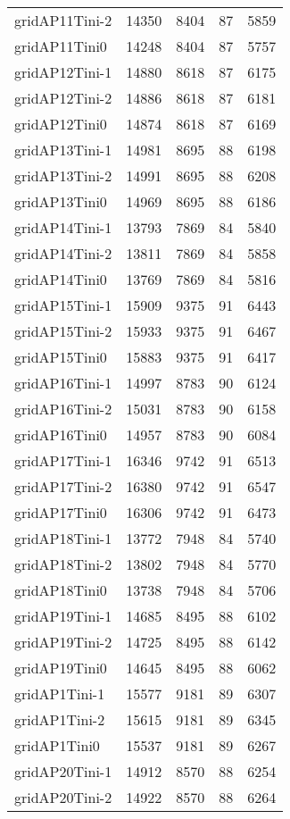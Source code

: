 \begin{longtable}{lrrrr}
gridAP11Tini-2 & 14350 & 8404 & 87 & 5859 \\
gridAP11Tini0 & 14248 & 8404 & 87 & 5757 \\
gridAP12Tini-1 & 14880 & 8618 & 87 & 6175 \\
gridAP12Tini-2 & 14886 & 8618 & 87 & 6181 \\
gridAP12Tini0 & 14874 & 8618 & 87 & 6169 \\
gridAP13Tini-1 & 14981 & 8695 & 88 & 6198 \\
gridAP13Tini-2 & 14991 & 8695 & 88 & 6208 \\
gridAP13Tini0 & 14969 & 8695 & 88 & 6186 \\
gridAP14Tini-1 & 13793 & 7869 & 84 & 5840 \\
gridAP14Tini-2 & 13811 & 7869 & 84 & 5858 \\
gridAP14Tini0 & 13769 & 7869 & 84 & 5816 \\
gridAP15Tini-1 & 15909 & 9375 & 91 & 6443 \\
gridAP15Tini-2 & 15933 & 9375 & 91 & 6467 \\
gridAP15Tini0 & 15883 & 9375 & 91 & 6417 \\
gridAP16Tini-1 & 14997 & 8783 & 90 & 6124 \\
gridAP16Tini-2 & 15031 & 8783 & 90 & 6158 \\
gridAP16Tini0 & 14957 & 8783 & 90 & 6084 \\
gridAP17Tini-1 & 16346 & 9742 & 91 & 6513 \\
gridAP17Tini-2 & 16380 & 9742 & 91 & 6547 \\
gridAP17Tini0 & 16306 & 9742 & 91 & 6473 \\
gridAP18Tini-1 & 13772 & 7948 & 84 & 5740 \\
gridAP18Tini-2 & 13802 & 7948 & 84 & 5770 \\
gridAP18Tini0 & 13738 & 7948 & 84 & 5706 \\
gridAP19Tini-1 & 14685 & 8495 & 88 & 6102 \\
gridAP19Tini-2 & 14725 & 8495 & 88 & 6142 \\
gridAP19Tini0 & 14645 & 8495 & 88 & 6062 \\
gridAP1Tini-1 & 15577 & 9181 & 89 & 6307 \\
gridAP1Tini-2 & 15615 & 9181 & 89 & 6345 \\
gridAP1Tini0 & 15537 & 9181 & 89 & 6267 \\
gridAP20Tini-1 & 14912 & 8570 & 88 & 6254 \\
gridAP20Tini-2 & 14922 & 8570 & 88 & 6264 \\

\end{longtable}
